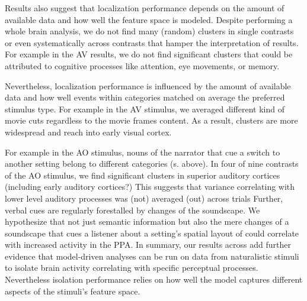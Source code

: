 \documentclass[english]{article}
\begin{document}
Results also suggest that localization performance depends on the
amount of available data and how well the feature space is modeled.
Despite performing a whole brain analysis, we do not find many (random) clusters
in single contrasts or even systematically across contrasts that hamper the
interpretation of results.
For example in the AV results, we do not find significant clusters that could be
attributed to cognitive processes like attention, eye movements, or
memory.

Nevertheless, localization performance is influenced by the amount of available
data and how well
events within categories matched on average the preferred stimulus type.
For example in the AV stimulus, we averaged different kind of movie cuts
regardless to the movie frames content.
As a result, clusters are more widespread and reach into early visual cortex.



For example in the AO stimulus, nouns of the narrator that cue a switch to
another setting belong to different categories (s. above).
In four of nine contrasts of the AO stimulus, we find significant clusters in
superior auditory cortices (including early auditory cortices?)
This suggests that variance correlating with lower level auditory processes was
(not) averaged (out) across trials
Further, verbal cues are regularly forestalled by changes of the
soundscape.
We hypothesize that not just semantic information but also the mere changes of a
soundscape that cues a listener about a setting's spatial layout of could
correlate with increased activity in the PPA.
In summary, our results across add further evidence that model-driven analyses
can be run on data from naturalistic stimuli to isolate brain activity
correlating with specific perceptual processes.
Nevertheless isolation performance relies on how well the model captures
different aspects of the stimuli's feature space.
\end{document}
